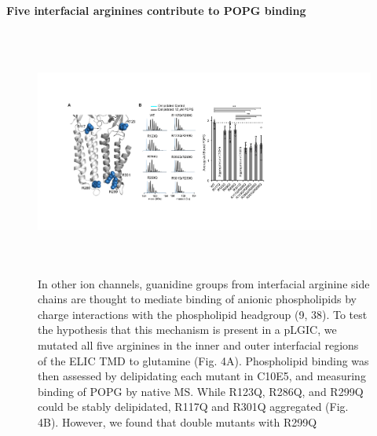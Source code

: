 \textbf{Five interfacial arginines contribute to POPG binding}
\begin{figure}
\includegraphics[width=6.51458in,height=3.22361in]{./pandoc_test/media/image5.pdf}
\caption{In other ion channels, guanidine groups from interfacial arginine side
chains are thought to mediate binding of anionic phospholipids by charge
interactions with the phospholipid headgroup (9, 38). To test the
hypothesis that this mechanism is present in a pLGIC, we mutated all
five arginines in the inner and outer interfacial regions of the ELIC
TMD to glutamine (Fig. 4A). Phospholipid binding was then assessed by
delipidating each mutant in C10E5, and measuring binding of POPG by
native MS. While R123Q, R286Q, and R299Q could be stably delipidated,
R117Q and R301Q aggregated (Fig. 4B). However, we found that double
mutants with R299Q}
\end{figure}
